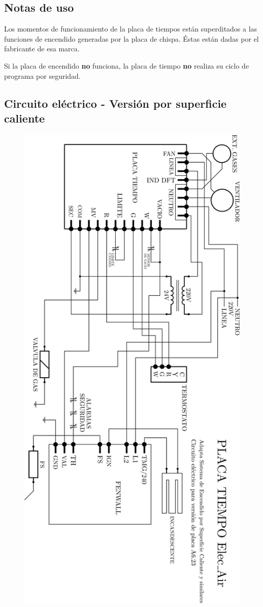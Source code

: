 \documentclass{article}
\begin{document}
\subsection*{Notas de uso}
Los momentos de funcionamiento de la placa de tiempos están superditados a las funciones de encendido generadas por la placa de chispa. Éstas están dadas por el fabricante de esa marca.\par Si la placa de encendido \textbf{no} funciona, la placa de tiempo \textbf{no} realiza su ciclo de programa por seguridad.
\newpage

\newpage

\subsection*{Circuito eléctrico - Versión por superficie caliente}

\begin{figure}[H]
\centering
\includegraphics[width=0.65\linewidth]{images/PlacaTiempo_PlanoFenwallV623.png}
\end{figure}
\end{document}
